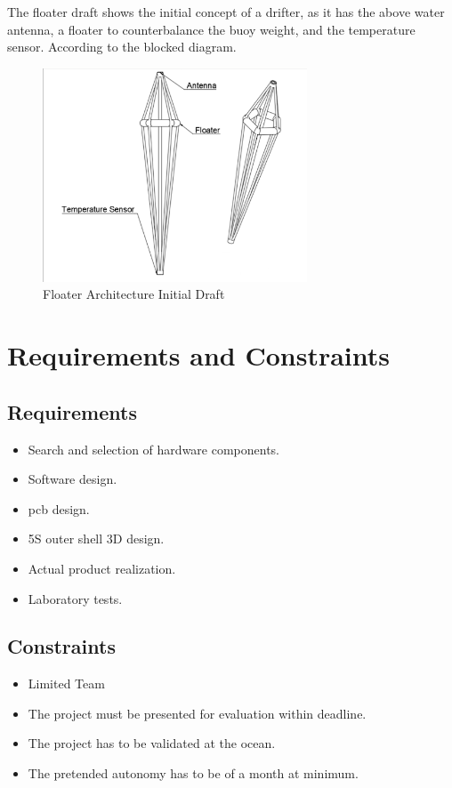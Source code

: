 The floater draft shows the initial concept of a drifter, as it has the above water 
antenna, a floater to counterbalance the buoy weight, and the temperature sensor. 
According to the blocked diagram.
\begin{figure}[H]
    \centering
    \includegraphics[width=0.7\textwidth]{images/diagrams/shell/unnamed.png}  %
    \caption{Floater Architecture Initial Draft}
    \label{fig:Floater Architecture Initial Draft}        
\end{figure}

\section{Requirements and Constraints}
\subsection{Requirements}
\begin{itemize}
    \item Search and selection of hardware components.
    \item Software design.
    \item \acrshort{pcb} design.
    \item 5S outer shell 3D design.
    \item Actual product realization.
    \item Laboratory tests.
\end{itemize}
\subsection{Constraints}
\begin{itemize}
    \item Limited Team
    \item The project must be presented for evaluation within deadline.
    \item The project has to be validated at the ocean.
    \item The pretended autonomy has to be of a month at minimum.
\end{itemize}

